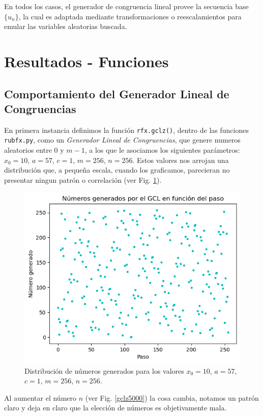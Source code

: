 \documentclass[baaa]{baaa}
\begin{document}
En todos los casos, el generador de congruencia lineal provee la secuencia base $\{u_n\}$, la cual es adaptada mediante transformaciones o reescalamientos para emular las variables aleatorias buscada.



\section{Resultados - Funciones}

\subsection{Comportamiento del Generador Lineal de Congruencias}

En primera instancia definimos la función \texttt{rfx.gclz()}, dentro de las funciones \texttt{rubfx.py}, como un \textit{Generador Lineal de Congruencias}, que genere numeros aleatorios entre $0$ y $m-1$, a los que le asociamos los siguientes parámetros:$x_0=10$, $a=57$, $c=1$, $m=256$, $n=256$. Estos valores nos arrojan una distribución que, a pequeña escala, cuando los graficamos, parecieran no presentar ningun patrón o correlación (ver Fig. \ref{gclz256}).

\begin{figure}[!h]
    \centering
    \includegraphics[width=0.9\linewidth]{imagenes/gclz256.png}
    \caption{Distribución de números generados para los valores $x_0=10$, $a=57$, $c=1$, $m=256$, $n=256$.}
    \label{gclz256}
\end{figure}

Al aumentar el número $n$ (ver Fig. \ref{gclz5000}) la cosa cambia, notamos un patrón claro y deja en claro que la elección de números es objetivamente mala.
\end{document}
